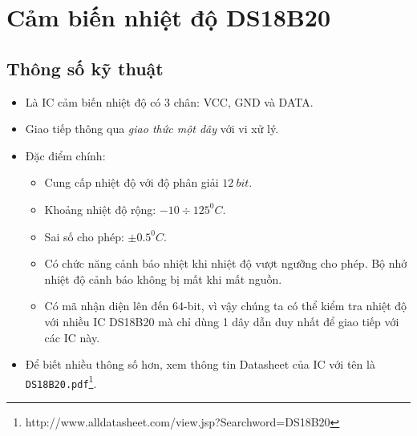 \section{Cảm biến nhiệt độ DS18B20}
\subsection{Thông số kỹ thuật}
\begin{itemize}
\item Là IC cảm biến nhiệt độ có 3 chân: VCC, GND và DATA.
\item Giao tiếp thông qua \textit{giao thức một dây} với vi xử lý.
\item Đặc điểm chính:
\begin{itemize}
\item Cung cấp nhiệt độ với độ phân giải $12~bit$.
\item Khoảng nhiệt độ rộng: $-10 \div 125^0C$.
\item Sai số cho phép: $\pm0.5^0C$.
\item Có chức năng cảnh báo nhiệt khi nhiệt độ vượt ngưỡng cho phép. Bộ nhớ nhiệt độ cảnh báo không bị mất khi mất nguồn.
\item Có mã nhận diện lên đến 64-bit, vì vậy chúng ta có thể kiểm tra nhiệt độ với nhiều IC DS18B20 mà chỉ dùng 1 dây dẫn duy nhất để giao tiếp với các IC này.
\end{itemize}
\item Để biết nhiều thông số hơn, xem thông tin Datasheet của IC với tên là \verb|DS18B20.pdf|\footnote{http://www.alldatasheet.com/view.jsp?Searchword=DS18B20}.
\end{itemize}
